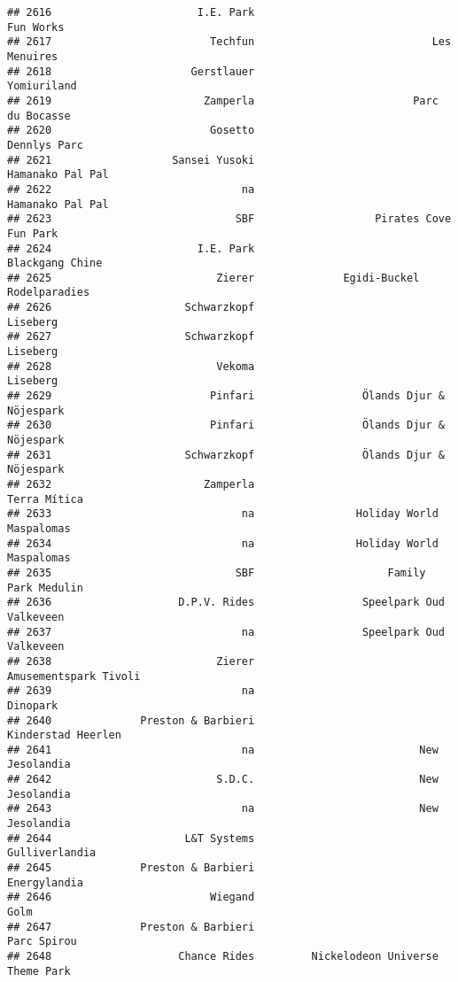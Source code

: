 \documentclass[
]{article}
\begin{document}
\begin{verbatim}
## 2616                       I.E. Park                               Fun Works
## 2617                         Techfun                            Les Menuires
## 2618                      Gerstlauer                             Yomiuriland
## 2619                        Zamperla                         Parc du Bocasse
## 2620                         Gosetto                            Dennlys Parc
## 2621                   Sansei Yusoki                        Hamanako Pal Pal
## 2622                              na                        Hamanako Pal Pal
## 2623                             SBF                   Pirates Cove Fun Park
## 2624                       I.E. Park                         Blackgang Chine
## 2625                          Zierer              Egidi-Buckel Rodelparadies
## 2626                     Schwarzkopf                                Liseberg
## 2627                     Schwarzkopf                                Liseberg
## 2628                          Vekoma                                Liseberg
## 2629                         Pinfari                 Ölands Djur & Nöjespark
## 2630                         Pinfari                 Ölands Djur & Nöjespark
## 2631                     Schwarzkopf                 Ölands Djur & Nöjespark
## 2632                        Zamperla                            Terra Mítica
## 2633                              na                Holiday World Maspalomas
## 2634                              na                Holiday World Maspalomas
## 2635                             SBF                     Family Park Medulin
## 2636                    D.P.V. Rides                 Speelpark Oud Valkeveen
## 2637                              na                 Speelpark Oud Valkeveen
## 2638                          Zierer                   Amusementspark Tivoli
## 2639                              na                                Dinopark
## 2640              Preston & Barbieri                      Kinderstad Heerlen
## 2641                              na                          New Jesolandia
## 2642                          S.D.C.                          New Jesolandia
## 2643                              na                          New Jesolandia
## 2644                     L&T Systems                          Gulliverlandia
## 2645              Preston & Barbieri                            Energylandia
## 2646                         Wiegand                                    Golm
## 2647              Preston & Barbieri                             Parc Spirou
## 2648                    Chance Rides         Nickelodeon Universe Theme Park

\end{verbatim}
\end{document}
